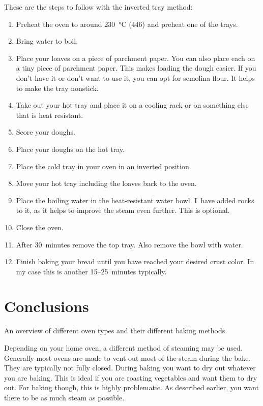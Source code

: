 These are the steps to follow with the inverted tray method:
\begin{enumerate}
\item Preheat the oven to around  \qty{230}{\degreeCelsius} (\qty{446}{\degF}) and
preheat one of the trays.
\item Bring water to boil.
\item Place your loaves on a piece of parchment paper. You
can also place each on a tiny piece of parchment paper.
This makes loading the dough easier. If you don't
have it or don't want to use it, you can opt for
semolina flour. It helps to make the tray nonstick.
\item Take out your hot tray and place it
on a cooling rack or on something else that
is heat resistant.
\item Score your doughs.
\item Place your doughs on the hot tray.
\item Place the cold tray in your oven in an inverted position.
\item Move your hot tray including the loaves back
to the oven.
\item Place the boiling water in the heat-resistant
water bowl. I~have added rocks to it, as it helps
to improve the steam even further. This is optional.
\item Close the oven.
\item After 30~minutes remove the top tray. Also remove the bowl with water.
\item Finish baking your bread until you have reached your desired
crust color. In my case this is another 15--25~minutes typically.
\end{enumerate}

\section{Conclusions}

\begin{table}[!htb]
    \begin{center}
        
        \caption[Different oven types]{An overview of different oven types and their
            different baking methods.}
    \end{center}
\end{table}

Depending on your home oven, a different method
of steaming may be used. Generally most ovens
are made to vent out most of the steam during the
bake. They are typically not fully closed. During
baking you want to dry out whatever you are baking.
This is ideal if you are roasting vegetables and
want them to dry out. For baking though, this is
highly problematic. As described earlier, you
want there to be as much steam as possible.

